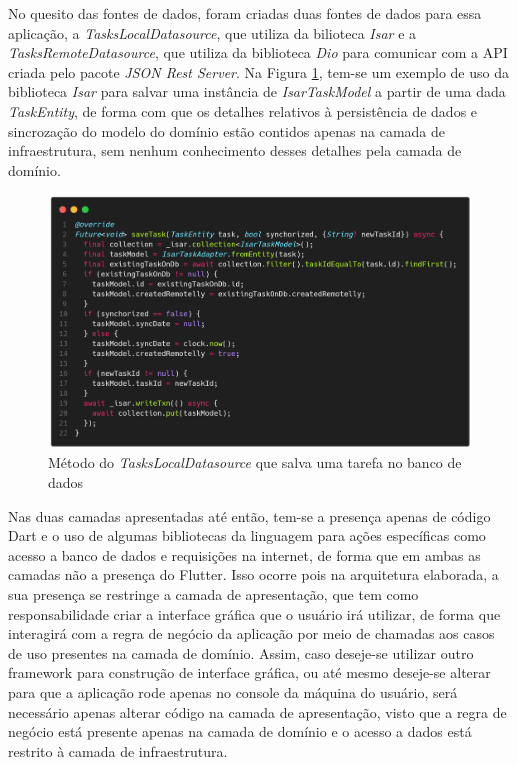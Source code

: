 \documentclass[12pt, %
openright, 
oneside, %
a4paper,    %
brazil]{facom-ufu-abntex2}
\begin{document}
No quesito das fontes de dados, foram criadas duas fontes de dados para essa aplicação, a \textit{TasksLocalDatasource}, que utiliza da bilioteca \textit{Isar} e a \textit{TasksRemoteDatasource}, que utiliza da biblioteca \textit{Dio} para comunicar com a API criada pelo pacote \textit{JSON Rest Server}. Na Figura \ref{fig:save_local_task}, tem-se um exemplo de uso da biblioteca \textit{Isar} para salvar uma instância de \textit{IsarTaskModel} a partir de uma dada \textit{TaskEntity}, de forma com que os detalhes relativos à persistência de dados e sincrozação do modelo do domínio estão contidos apenas na camada de infraestrutura, sem nenhum conhecimento desses detalhes pela camada de domínio.

\begin{figure}[ht]
    \centering
    \includegraphics[width=.7\textwidth, trim={0 30 0 100}, clip]{figures/arch/save_local_task.png}
    \caption{Método do \textit{TasksLocalDatasource} que salva uma tarefa no banco de dados}
    \label{fig:save_local_task}
\end{figure}

Nas duas camadas apresentadas até então, tem-se a presença apenas de código Dart e o uso de algumas bibliotecas da linguagem para ações específicas como acesso a banco de dados e requisições na internet, de forma que em ambas as camadas não a presença do Flutter. Isso ocorre pois na arquitetura elaborada, a sua presença se restringe a camada de apresentação, que tem como responsabilidade criar a interface gráfica que o usuário irá utilizar, de forma que interagirá com a regra de negócio da aplicação por meio de chamadas aos casos de uso presentes na camada de domínio. Assim, caso deseje-se utilizar outro framework para construção de interface gráfica, ou até mesmo deseje-se alterar para que a aplicação rode apenas no console da máquina do usuário, será necessário apenas alterar código na camada de apresentação, visto que a regra de negócio está presente apenas na camada de domínio e o acesso a dados está restrito à camada de infraestrutura.
\end{document}
